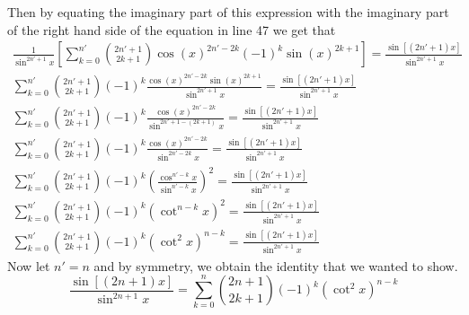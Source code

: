 \documentclass[11pt,reqno, tikz, border=3mm]{amsart}
\theoremstyle{plain}
\theoremstyle{definition}
\theoremstyle{remark}
\begin{document}
Then by equating the imaginary part of this expression with the imaginary part of the right hand side of the equation in line 47 we get that
\begin{align}
\frac{1}{\sin^{2n'+1}x}\left [ \sum^{n'}_{k=0} \binom{2n'+1}{2k+1}\cos(x)^{2n'-2k}(-1)^k \sin(x)^{2k+1}\right] = \frac{\sin[(2n'+1)x]}{\sin^{2n'+1}x} \\
\sum^{n'}_{k=0} \binom{2n'+1}{2k+1}(-1)^k \frac{\cos(x)^{2n'-2k}\sin(x)^{2k+1}}{\sin^{2n'+1}x}  = \frac{\sin[(2n'+1)x]}{\sin^{2n'+1}x} \\
\sum^{n'}_{k=0} \binom{2n'+1}{2k+1}(-1)^k \frac{\cos(x)^{2n'-2k}}{\sin^{2n'+1-(2k+1)}x}  = \frac{\sin[(2n'+1)x]}{\sin^{2n'+1}x} \\
\sum^{n'}_{k=0} \binom{2n'+1}{2k+1}(-1)^k \frac{\cos(x)^{2n'-2k}}{\sin^{2n'-2k}x}  = \frac{\sin[(2n'+1)x]}{\sin^{2n'+1}x} \\
\sum^{n'}_{k=0} \binom{2n'+1}{2k+1}(-1)^k \left(\frac{\cos^{n'-k}x}{\sin^{n'-k}x}\right)^2  = \frac{\sin[(2n'+1)x]}{\sin^{2n'+1}x} \\
\sum^{n'}_{k=0} \binom{2n'+1}{2k+1}(-1)^k \left(\cot^{n-k} x\right)^2  = \frac{\sin[(2n'+1)x]}{\sin^{2n'+1}x} \\
\sum^{n'}_{k=0} \binom{2n'+1}{2k+1}(-1)^k \left(\cot^2 x\right)^{n-k}  = \frac{\sin[(2n'+1)x]}{\sin^{2n'+1}x} 
\end{align}
Now let $n' = n$ and by symmetry, we obtain the identity that we wanted to show.
$$\frac{\sin\left[(2n+1)x\right]}{\sin^{2n+1}x} = \sum^n_{k=0}\binom{2n+1}{2k+1}(-1)^k(\cot^2x)^{n-k}$$
\end{document}
